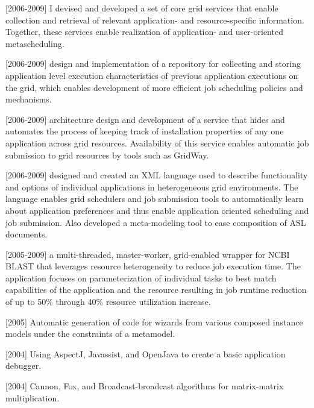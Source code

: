 \documentclass{article}
\begin{document}
[2006-2009]
I devised and developed a set of core grid services that enable collection and retrieval of relevant application- and resource-specific information. Together, these services enable realization of application- and user-oriented metascheduling.

[2006-2009]
design and implementation of a repository for collecting and storing application level execution characteristics of previous application executions on the grid, which enables development of more efficient job scheduling policies and mechanisms.

[2006-2009]
architecture design and development of a service that hides and automates the process of keeping track of installation properties of any one application across grid resources. Availability of this service enables automatic job submission to grid resources by tools such as GridWay.

[2006-2009]
designed and created an XML language used to describe functionality and options of individual applications in heterogeneous grid environments. The language enables grid schedulers and job submission tools to automatically learn about application preferences and thus enable application oriented scheduling and job submission. Also developed a meta-modeling tool to ease composition of ASL documents.

[2005-2009]
a multi-threaded, master-worker, grid-enabled wrapper for NCBI BLAST that leverages resource heterogeneity to reduce job execution time. The application focuses on parameterization of individual tasks to best match capabilities of the application and the resource resulting in job runtime reduction of up to 50\% through 40\% resource utilization increase.

[2005]
Automatic generation of code for wizards from various composed instance models under the constraints of a metamodel.

[2004]
Using AspectJ, Javassist, and OpenJava to create a basic application debugger.

[2004]
Cannon, Fox, and Broadcast-broadcast algorithms for matrix-matrix multiplication.
\end{document}
